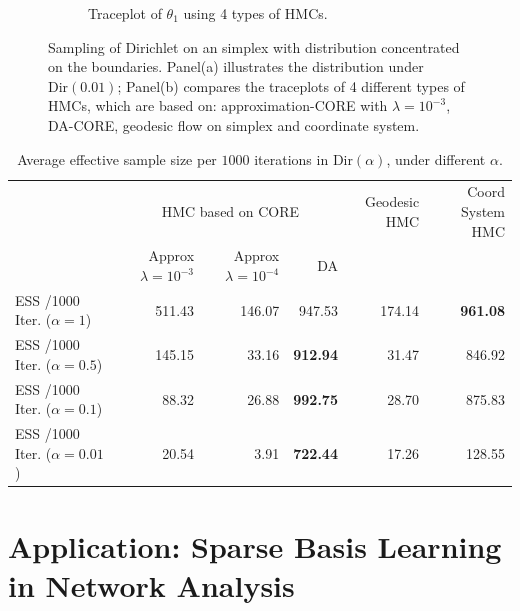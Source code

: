\documentclass[10pt,fleqn]{article}
\DeclareMathOperator{\1}{\mathbbm{1}}
\begin{document}
\begin{figure}[H]
\begin{subfigure}[b]{0.45\textwidth}
\caption{Traceplot of $\theta_1$ using 4 types of HMCs.}
\end{subfigure}
\caption{Sampling of Dirichlet on an simplex with distribution concentrated on the boundaries.
Panel(a) illustrates the distribution under $\text{Dir}(0.01)$; Panel(b)
compares the traceplots of 4 different types of HMCs, which are based on: approximation-CORE with $\lambda=10^{-3}$, DA-CORE, geodesic flow on simplex \citep{byrne2013geodesic} and coordinate
system.}
\label{simplex}
\end{figure}


   \begin{table}[H]
     
   \begin{center}
   \tiny
   \begin{tabular}{ l| r | r| r |r | r}
   \hline     
    & \multicolumn{3}{c|}{HMC based on CORE}     & Geodesic HMC  & Coord
    System HMC \\   
        & {Approx $\lambda=10^{-3}$} & {Approx $\lambda=10^{-4}$}      & DA
        &  \\  \hline         
   ESS /1000 Iter. ($\alpha=1$) & 511.43   & 146.07  & 947.53 &  174.14
   & \bf 961.08     \\
      ESS /1000 Iter. ($\alpha=0.5$) & 145.15  & 33.16  &\bf  912.94  & 31.47  & 846.92   \\
            ESS /1000 Iter. ($\alpha=0.1$) &  88.32   & 26.88& \bf 992.75  &28.70  & 875.83    \\
   ESS /1000 Iter. ($\alpha=0.01$) & 20.54 & 3.91 & {\bf 722.44} & 17.26  & 128.55  \\
   \hline  
   \end{tabular}
   \end{center}
   \caption{Average effective sample size per $1000$ iterations in $\text{Dir}(\alpha)$,
   under different $\alpha$. \label{simplex_tb}
}
   \end{table}

   \section{Application: Sparse Basis Learning in Network Analysis}
\end{document}
